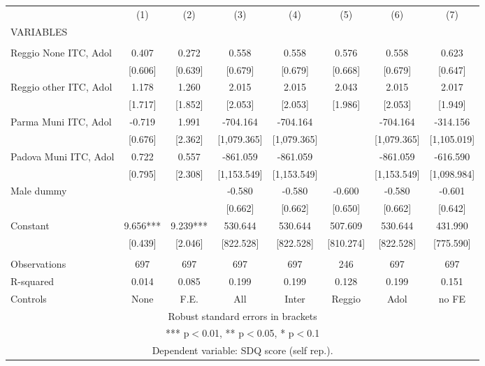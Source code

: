 \begin{tabular}{lccccccc} \hline
 & (1) & (2) & (3) & (4) & (5) & (6) & (7) \\
VARIABLES &  &  &  &  &  &  &  \\ \hline
 &  &  &  &  &  &  &  \\
Reggio None ITC, Adol & 0.407 & 0.272 & 0.558 & 0.558 & 0.576 & 0.558 & 0.623 \\
 & [0.606] & [0.639] & [0.679] & [0.679] & [0.668] & [0.679] & [0.647] \\
Reggio other ITC, Adol & 1.178 & 1.260 & 2.015 & 2.015 & 2.043 & 2.015 & 2.017 \\
 & [1.717] & [1.852] & [2.053] & [2.053] & [1.986] & [2.053] & [1.949] \\
Parma Muni ITC, Adol & -0.719 & 1.991 & -704.164 & -704.164 &  & -704.164 & -314.156 \\
 & [0.676] & [2.362] & [1,079.365] & [1,079.365] &  & [1,079.365] & [1,105.019] \\
Padova Muni ITC, Adol & 0.722 & 0.557 & -861.059 & -861.059 &  & -861.059 & -616.590 \\
 & [0.795] & [2.308] & [1,153.549] & [1,153.549] &  & [1,153.549] & [1,098.984] \\
Male dummy &  &  & -0.580 & -0.580 & -0.600 & -0.580 & -0.601 \\
 &  &  & [0.662] & [0.662] & [0.650] & [0.662] & [0.642] \\
Constant & 9.656*** & 9.239*** & 530.644 & 530.644 & 507.609 & 530.644 & 431.990 \\
 & [0.439] & [2.046] & [822.528] & [822.528] & [810.274] & [822.528] & [775.590] \\
 &  &  &  &  &  &  &  \\
Observations & 697 & 697 & 697 & 697 & 246 & 697 & 697 \\
R-squared & 0.014 & 0.085 & 0.199 & 0.199 & 0.128 & 0.199 & 0.151 \\
 Controls & None & F.E. & All & Inter & Reggio & Adol & no FE \\ \hline
\multicolumn{8}{c}{ Robust standard errors in brackets} \\
\multicolumn{8}{c}{ *** p$<$0.01, ** p$<$0.05, * p$<$0.1} \\
\multicolumn{8}{c}{ Dependent variable: SDQ score (self rep.).} \\
\end{tabular}
